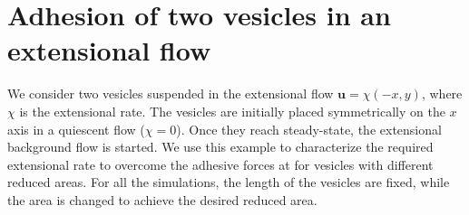 \documentclass[aps,prl,twocolumn,showpacs,amsmath,amssymb]{revtex4-1}
\newcommand{\uu}{\mathbf{u}}
\begin{document}
%
%
%
%
%

\newpage %
\section{Adhesion of two vesicles in an extensional flow} 
\label{sec:eflow} 
We consider two vesicles suspended in the extensional flow $\uu =
\chi(-x,y)$, where $\chi$ is the extensional rate.  The vesicles are
initially placed symmetrically on the $x$ axis in a quiescent flow
($\chi = 0$).  Once they reach steady-state, the extensional background
flow is started.  We use this example to characterize the required
extensional rate to overcome the adhesive forces at for vesicles with
different reduced areas.  For all the simulations, the length of the
vesicles are fixed, while the area is changed to achieve the desired
reduced area.
\end{document}
